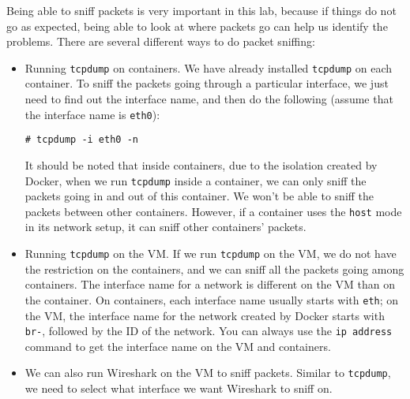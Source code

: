 
Being able to sniff packets is very
important in this lab, because if things do not go as expected, being
able to look at where packets go can help us identify the problems.
There are several different ways to do packet sniffing:


\begin{itemize}
\item Running \texttt{tcpdump} on containers.
We have already installed \texttt{tcpdump}
on each container. To sniff the packets going through a particular
interface, we just need to find out the interface name, and then do the
following (assume that the interface name is \texttt{eth0}):

\begin{lstlisting}
# tcpdump -i eth0 -n
\end{lstlisting}

It should be noted that inside containers, due to the isolation created by
Docker, when we run \texttt{tcpdump} inside a container,
we can only sniff the packets going in and out of this container.
We won't be able to sniff the packets between other containers. 
However, if a container uses the \texttt{host} mode in its 
network setup, it can sniff other containers' packets. 


\item Running \texttt{tcpdump} on the VM. If we run \texttt{tcpdump}
on the VM, we do not have the restriction on the containers, and
we can sniff all the packets going among containers. The interface
name for a network is different on the VM than on the container.
On containers, each interface name usually starts with \texttt{eth};
on the VM, the interface name for the network created
by Docker starts with \texttt{br-}, followed by the ID of the network.
You can always use the \texttt{ip address} command to get the
interface name on the VM and containers.

\item We can also run Wireshark on the VM to sniff packets.
Similar to \texttt{tcpdump}, we need to select what interface
we want Wireshark to sniff on.
\end{itemize}

